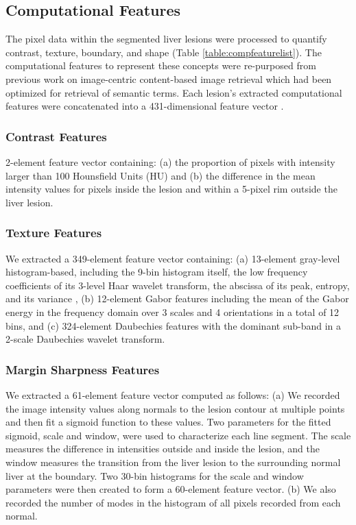 \subsection{Computational Features}
The pixel data within the segmented liver lesions were processed to quantify contrast, texture, boundary, and shape (Table \ref{table:compfeaturelist}). The computational features to represent these concepts were re-purposed from previous work on image-centric content-based image retrieval\cite{Xu:2012bh,Napel:2010vb} which had been optimized for retrieval of semantic terms. Each lesion's extracted computational features were concatenated into a 431-dimensional feature vector .

\subsubsection{Contrast Features}
2-element feature vector containing: (a) the proportion of pixels with intensity larger than 100 Hounsfield Units (HU) and (b) the difference in the mean intensity values for pixels inside the lesion and within a 5-pixel rim outside the liver lesion.

\subsubsection{Texture Features}
We extracted a 349-element feature vector containing: (a) 13-element gray-level histogram-based, including the 9-bin histogram itself, the low frequency coefficients of its 3-level Haar wavelet transform, the abscissa of its peak, entropy, and its variance \cite{Strela:2002vq}, (b) 12-element Gabor features \cite{Zhao:2005wb} including the mean of the Gabor energy in the frequency domain over 3 scales and 4 orientations in a total of 12 bins, and (c) 324-element Daubechies features with the dominant sub-band in a 2-scale Daubechies wavelet transform.

\subsubsection{Margin Sharpness Features}
We extracted a 61-element feature vector computed as follows: (a) We recorded the image intensity values along normals to the lesion contour at multiple points and then fit a sigmoid function to these values.  Two parameters for the fitted sigmoid, scale and window, were used to characterize each line segment. The scale measures the difference in intensities outside and inside the lesion, and the window measures the transition from the liver lesion to the surrounding normal liver at the boundary. Two 30-bin histograms for the scale and window parameters were then created to form a 60-element feature vector. (b) We also recorded the number of modes in the histogram of all pixels recorded from each normal.

